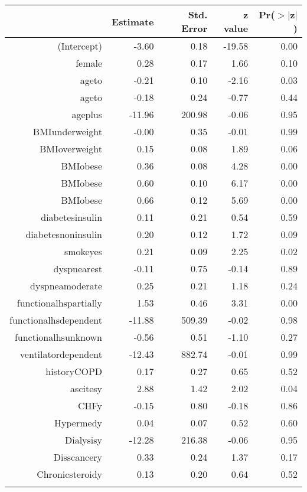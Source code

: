 \bigskip\bigskip
\centering
\begin{tabular}{rrrrr}
  \hline
 & Estimate & Std. Error & z value & Pr($>$$|$z$|$) \\ 
  \hline
(Intercept) & -3.60 & 0.18 & -19.58 & 0.00 \\ 
  female & 0.28 & 0.17 & 1.66 & 0.10 \\ 
  age\-65\-to\-74 & -0.21 & 0.10 & -2.16 & 0.03 \\ 
  age\-75\-to\-84 & -0.18 & 0.24 & -0.77 & 0.44 \\ 
  age\-85\-plus & -11.96 & 200.98 & -0.06 & 0.95 \\ 
  BMI\-underweight & -0.00 & 0.35 & -0.01 & 0.99 \\ 
  BMI\-overweight & 0.15 & 0.08 & 1.89 & 0.06 \\ 
  BMI\-obese\-1 & 0.36 & 0.08 & 4.28 & 0.00 \\ 
  BMI\-obese\-2 & 0.60 & 0.10 & 6.17 & 0.00 \\ 
  BMI\-obese\-3 & 0.66 & 0.12 & 5.69 & 0.00 \\ 
  diabetes\-insulin & 0.11 & 0.21 & 0.54 & 0.59 \\ 
  diabetes\-noninsulin & 0.20 & 0.12 & 1.72 & 0.09 \\ 
  smoke\-yes & 0.21 & 0.09 & 2.25 & 0.02 \\ 
  dyspnea\-rest & -0.11 & 0.75 & -0.14 & 0.89 \\ 
  dyspnea\-moderate & 0.25 & 0.21 & 1.18 & 0.24 \\ 
  functional\-hs\-partially & 1.53 & 0.46 & 3.31 & 0.00 \\ 
  functional\-hs\-dependent & -11.88 & 509.39 & -0.02 & 0.98 \\ 
  functional\-hs\-unknown & -0.56 & 0.51 & -1.10 & 0.27 \\ 
  ventilator\-dependent & -12.43 & 882.74 & -0.01 & 0.99 \\ 
  history\-COPD & 0.17 & 0.27 & 0.65 & 0.52 \\ 
  ascites\-y & 2.88 & 1.42 & 2.02 & 0.04 \\ 
  CHF\-y & -0.15 & 0.80 & -0.18 & 0.86 \\ 
  Hyper\-med\-y & 0.04 & 0.07 & 0.52 & 0.60 \\ 
  Dialysis\-y & -12.28 & 216.38 & -0.06 & 0.95 \\ 
  Diss\-cancer\-y & 0.33 & 0.24 & 1.37 & 0.17 \\ 
  Chronic\-steroid\-y & 0.13 & 0.20 & 0.64 & 0.52 \\ 
$$
\end{tabular}
